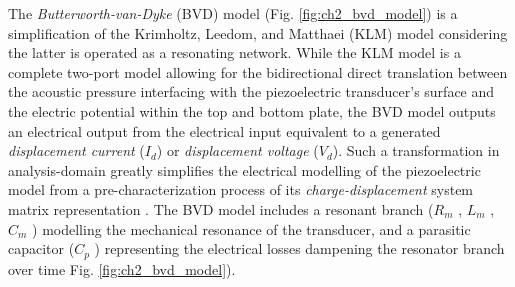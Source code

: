 The \emph{Butterworth-van-Dyke} (BVD) model \cite{VanDyke1928poti} (Fig. \ref{fig:ch2_bvd_model}) is a simplification of the 
Krimholtz, Leedom, and Matthaei (KLM) model \cite{Leedom1971itosau} considering the latter is operated as 
a resonating network. While the KLM model is a complete two-port model allowing for the bidirectional 
direct translation between the 
acoustic pressure interfacing with the piezoelectric transducer's surface and the electric potential within 
the top and bottom plate, the BVD model outputs an electrical output from the electrical input 
equivalent to a generated \emph{displacement current} ($I_d$) or \emph{displacement voltage} ($V_d$).
Such a transformation in analysis-domain greatly simplifies the electrical modelling 
of the piezoelectric model from a pre-characterization process of its \emph{charge-displacement} 
system matrix representation \cite{Szabo2014duiioTransducers}. The BVD model includes a resonant 
branch ($R_m$ , $L_m$ , $C_m$ ) modelling the mechanical resonance of the transducer, and a parasitic capacitor 
($C_p$ ) representing the electrical losses dampening the resonator branch over time Fig. \ref{fig:ch2_bvd_model}).

